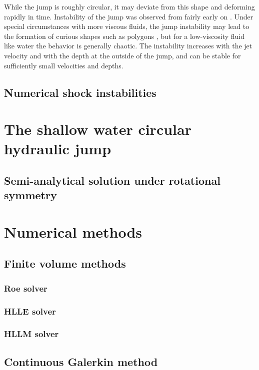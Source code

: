 \documentclass{article}
\begin{document}
While the jump is roughly circular, it may deviate from this shape and
deforming rapidly in time.
Instability of the jump was observed from fairly early on \cite{craik1981circular}.
Under special circumstances with more viscous fluids, the jump instability may lead to
the formation of curious shapes such as polygons \cite{ellegaard1998creating}, but
for a low-viscosity fluid like water the behavior is generally chaotic.
The instability increases with the jet velocity and with the depth at the outside of the jump,
and can be stable for sufficiently small velocities and depths.

\subsection{Numerical shock instabilities}

\section{The shallow water circular hydraulic jump}

\subsection{Semi-analytical solution under rotational symmetry}

\section{Numerical methods}

\subsection{Finite volume methods}

\subsubsection{Roe solver}

\subsubsection{HLLE solver}

\subsubsection{HLLM solver}

\subsection{Continuous Galerkin method}
\end{document}
